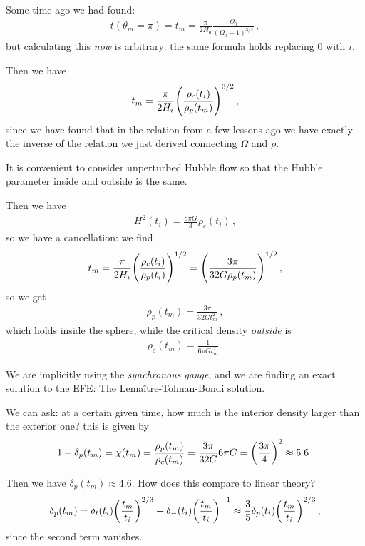 \documentclass[main.tex]{subfiles}
\begin{document}
Some time ago we had found: 
%
\begin{align}
t (\theta_{m} = \pi ) = t_m = \frac{\pi }{2 H_0 } \frac{\Omega_0 }{(\Omega_0 - 1)^{3/2}}
\,,
\end{align}
%
but calculating this \emph{now} is arbitrary: the same formula holds replacing \(0\) with \(i\). 

Then we have 
%
\begin{align}
t_m = \frac{\pi }{2 H_i} \qty(\frac{\rho_{c}(t_i)}{\rho_{p}(t_m)})^{3/2}
\,,
\end{align}
%
since we have found that in the relation from a few lessons ago we have exactly the inverse of the relation we just derived connecting \(\Omega \) and \(\rho \). 

It is convenient to consider unperturbed Hubble flow so that the Hubble parameter inside and outside is the same. 

Then we have 
%
\begin{align}
H^2(t_i) = \frac{8 \pi G}{3} \rho_{c}(t_i)
\,,
\end{align}
%
so we have a cancellation: we find 
%
\begin{align}
t_m = \frac{\pi }{2 H_i} \qty(\frac{\rho_{c}(t_i)}{\rho_{p}(t_i)})^{1/2} = \qty(\frac{3 \pi }{32 G \rho_{p}(t_m)})^{1/2}
\,,
\end{align}
%
so we get 
%
\begin{align}
\rho_{p} (t_m) = \frac{3 \pi }{32 G t_m^2}
\,,
\end{align}
%
which holds inside the sphere, while the critical density \emph{outside} is 
%
\begin{align}
\rho_{c}(t_m) = \frac{1}{6 \pi G t_m^2}
\,.
\end{align}

We are implicitly using the \emph{synchronous gauge}, and we are finding an exact solution to the EFE: The Lemaître-Tolman-Bondi solution. 

We can ask: at a certain given time, how much is the interior density larger than the exterior one? this is given by 
%
\begin{align}
1 + \delta_{p}(t_m) = \chi (t_m) = \frac{\rho_{p}(t_m)}{\rho_{c}(t_m)} = \frac{3 \pi }{32 G } 6 \pi G = \qty(\frac{3 \pi }{4})^{2} \approx 5.6 
\,.
\end{align}

Then we have \(\delta_{p}(t_m) \approx 4.6\). 
How does this compare to linear theory? 
%
\begin{align}
\delta_p (t_m) = \delta_{t}(t_i) \qty(\frac{t_m }{t_i})^{2/3} + \delta_{-}(t_i) \qty(\frac{t_m}{t_i})^{-1}
\approx \frac{3}{5} \delta_{p}(t_i) \qty(\frac{t_m}{t_i})^{2/3} 
\,,
\end{align}
%
since the second term vanishes. 
\end{document}
